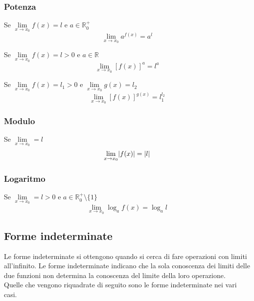\subsubsection{Potenza}
\begin{potenzaLimiti}
	Se $\lim\limits_{x\to x_0}f(x)=l$ e $a\in\mathbb{R}_0^+$
	\begin{equation*}
	\lim\limits_{x\to x_0}a^{f(x)} = a^l
	\end{equation*}
\end{potenzaLimiti}
\begin{potenzaLimiti1}
	Se $\lim\limits_{x\to x_0}f(x)=l>0$ e $a\in\mathbb{R}$
	\begin{equation*}
	\lim\limits_{x\to x_0}[f(x)]^a = l^a
	\end{equation*}
\end{potenzaLimiti1}
\begin{potenzaLimiti2}
	Se $\lim\limits_{x\to x_0}f(x)=l_1>0$ e $\lim\limits_{x\to x_0}g(x)=l_2$
	\begin{equation*}
	\lim\limits_{x\to x_0}[f(x)]^{g(x)} = l_1^{l_2}
	\end{equation*}
\end{potenzaLimiti2}

\subsubsection{Modulo}
\begin{moduloLimiti}
	Se $\lim\limits_{x\to x_0}=l$
	\begin{equation*}
	\lim\limits_{x\to x_0}\lvert f(x)\rvert=\lvert l\rvert
	\end{equation*}
\end{moduloLimiti}

\subsubsection{Logaritmo}
\begin{logLimiti}
	Se $\lim\limits_{x\to x_0}=l>0$ e $a\in\mathbb{R}_0^+\setminus\{1\}$
	\begin{equation*}
	\lim\limits_{x\to x_0}\log_af(x)=\log_al
	\end{equation*}
\end{logLimiti}

\subsection{Forme indeterminate}
Le forme indeterminate si ottengono quando si cerca di fare operazioni con limiti all'infinito. Le
forme indeterminate indicano che la sola conoscenza dei limiti delle due funzioni non determina la 
conoscenza del limite della loro operazione.\\
Quelle che vengono riquadrate di seguito sono le forme indeterminate nei vari casi.
